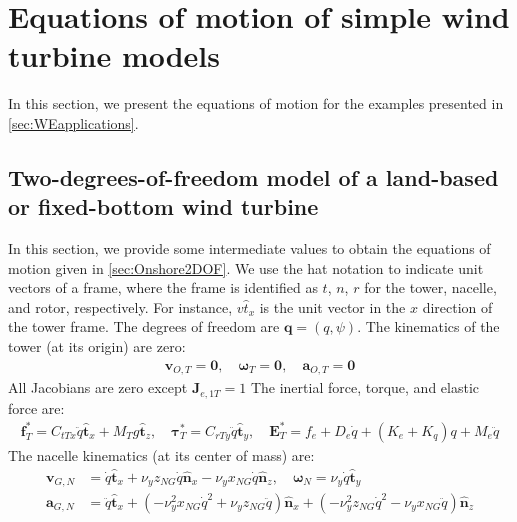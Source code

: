 \documentclass[wes, manuscript]{copernicus}
\renewcommand{\v}[1]{\boldsymbol{#1}}
\begin{document}
\section{Equations of motion of simple wind turbine models}

In this section, we present the equations of motion for the examples presented in \autoref{sec:WEapplications}. 
   


\subsection{Two-degrees-of-freedom model of a land-based or fixed-bottom wind turbine}
\label{sec:Onshore2DOFEq}
In this section, we provide some intermediate values to obtain the equations of motion given in \autoref{sec:Onshore2DOF}.
We use the hat notation to indicate unit vectors of a frame, where the frame is identified as $t$, $n$, $r$ for the tower, nacelle, and rotor, respectively. For instance, $v{\hat{t}}_x$  is the unit vector in the $x$ direction of the tower frame.
% 
The degrees of freedom are $\v{q}=(q,\psi)$.
The kinematics of the tower (at its origin) are zero:
\begin{align}
\v{v}_{O,T} = \v{0}
, \quad
\v{\omega}_{T} = \v{0}
, \quad
\v{a}_{O,T} = \v{0}
\end{align}
All Jacobians are zero except $\v{J}_{e,1T}=1$
The inertial force, torque, and elastic force are:
\begin{align}
\v{f}^*_T = C_{t Tx} \ddot{q}\v{\hat{t}}_x + M_{T} g\v{\hat{t}}_z
    ,\quad
\v{\tau}^*_T =  C_{r Ty} \ddot{q}\v{\hat{t}}_y
    ,\quad
\v{E}_T^*= f_e + D_{e} \dot{q} + (K_{e}+K_q) q + M_{e} \ddot{q}
\end{align}
The nacelle kinematics (at its center of mass) are:
\begin{align}
\v{v}_{G,N} &=  \dot{q}\v{\hat{t}}_x + \nu_y z_{NG} \dot{q}\v{\hat{n}}_x -  \nu_y x_{NG} \dot{q}\v{\hat{n}}_z
,\quad
\v{\omega}_{N} = \nu_y \dot{q}\v{\hat{t}}_y
\\
\v{a}_{G,N} &=  \ddot{q}\v{\hat{t}}_x + (- \nu_y^{2} x_{NG} \dot{q}^{2} + \nu_y z_{NG} \ddot{q})\v{\hat{n}}_x + (- \nu_y^{2} z_{NG} \dot{q}^{2} - \nu_y x_{NG} \ddot{q})\v{\hat{n}}_z
\end{align}
\end{document}
